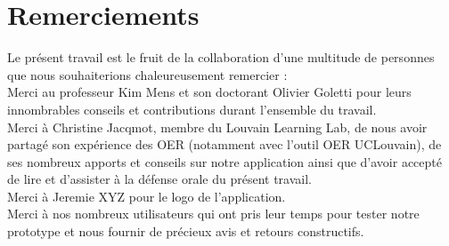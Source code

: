 \chapter*{Remerciements}

Le présent travail est le fruit de la collaboration d'une multitude de personnes que nous souhaiterions chaleureusement remercier : \\

Merci au professeur Kim Mens et son doctorant Olivier Goletti pour leurs innombrables conseils et contributions durant l'ensemble du travail. \\

Merci à Christine Jacqmot, membre du Louvain Learning Lab, de nous avoir partagé son expérience des OER (notamment avec l'outil OER UCLouvain), de ses nombreux apports et conseils sur notre application ainsi que d'avoir accepté de lire et d'assister à la défense orale du présent travail.\\

Merci à Jeremie XYZ pour le logo de l'application.\\

Merci à nos nombreux utilisateurs qui ont pris leur temps pour tester notre prototype et nous fournir de précieux avis et retours constructifs.


